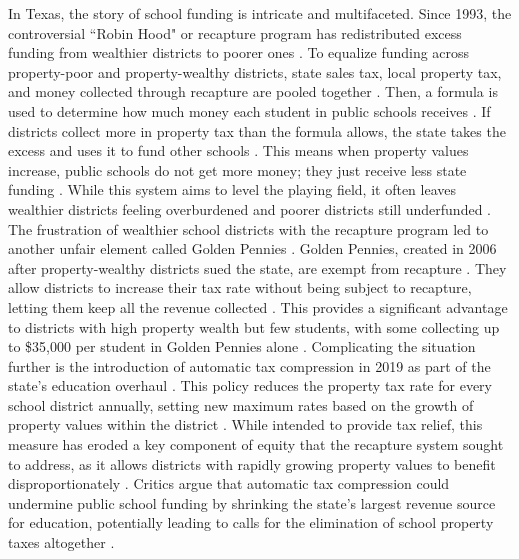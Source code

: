 \documentclass[sn-mathphys-num]{sn-jnl}%
\theoremstyle{thmstyleone}%
\theoremstyle{thmstyletwo}%
\theoremstyle{thmstylethree}%
\begin{document}
In Texas, the story of school funding is intricate and multifaceted. Since 1993, the controversial ``Robin Hood" or recapture program has redistributed excess funding from wealthier districts to poorer ones \cite{texas_tribune_school_funding, texas_standard_school_funding}. To equalize funding across property-poor and property-wealthy districts, state sales tax, local property tax, and money collected through recapture are pooled together \cite{texas_standard_school_funding}. Then, a formula is used to determine how much money each student in public schools receives \cite{texas_standard_school_funding, texas_tribune_school_funding}. If districts collect more in property tax than the formula allows, the state takes the excess and uses it to fund other schools \cite{texas_standard_school_funding, texas_tribune_school_funding}. This means when property values increase, public schools do not get more money; they just receive less state funding \cite{texas_standard_school_funding, texas_tribune_school_funding}. While this system aims to level the playing field, it often leaves wealthier districts feeling overburdened and poorer districts still underfunded \cite{texas_standard_school_funding, texas_tribune_school_funding}. The frustration of wealthier school districts with the recapture program led to another unfair element called Golden Pennies \cite{texas_standard_school_funding}. Golden Pennies, created in 2006 after property-wealthy districts sued the state, are exempt from recapture \cite{texas_standard_school_funding}. They allow districts to increase their tax rate without being subject to recapture, letting them keep all the revenue collected \cite{texas_standard_school_funding}. This provides a significant advantage to districts with high property wealth but few students, with some collecting up to \$35,000 per student in Golden Pennies alone \cite{texas_standard_school_funding}. Complicating the situation further is the introduction of automatic tax compression in 2019 as part of the state’s education overhaul \cite{texas_standard_school_funding}. This policy reduces the property tax rate for every school district annually, setting new maximum rates based on the growth of property values within the district \cite{texas_standard_school_funding}. While intended to provide tax relief, this measure has eroded a key component of equity that the recapture system sought to address, as it allows districts with rapidly growing property values to benefit disproportionately \cite{texas_standard_school_funding}. Critics argue that automatic tax compression could undermine public school funding by shrinking the state's largest revenue source for education, potentially leading to calls for the elimination of school property taxes altogether \cite{texas_standard_school_funding}.\\
\end{document}
